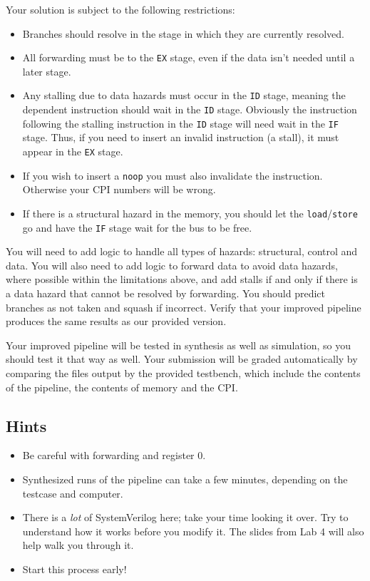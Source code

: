 \documentclass{article}
\begin{document}
Your solution is subject to the following restrictions:
\begin{itemize}
	\item Branches should resolve in the stage in which they are currently
		resolved.
	\item All forwarding must be to the \texttt{EX} stage, even if the data
		isn't needed until a later stage.
	\item Any stalling due to data hazards must occur in the \texttt{ID} stage,
		meaning the dependent instruction should wait in the \texttt{ID} stage.
		Obviously the instruction following the stalling instruction in the
		\texttt{ID} stage will need wait in the \texttt{IF} stage. Thus, if you
		need to insert an invalid instruction (a stall), it must appear in the
		\texttt{EX} stage. 
	\item If you wish to insert a \texttt{noop} you must also invalidate the
		instruction. Otherwise your CPI numbers will be wrong.
	\item If there is a structural hazard in the memory, you should let the
		\texttt{load}/\texttt{store} go and have the \texttt{IF} stage wait for
		the bus to be free.
\end{itemize}

You will need to add logic to handle all types of hazards: structural, control 
and data. You will also need to add logic to forward data to avoid data hazards,
where possible within the limitations above, and add stalls if and only if there
is a data hazard that cannot be resolved by forwarding. You should predict
branches as not taken and squash if incorrect. Verify that your improved
pipeline produces the same results as our provided version.

Your improved pipeline will be tested in synthesis as well as simulation, so you
should test it that way as well. Your submission will be graded automatically by
comparing the files output by the provided testbench, which include the
contents of the pipeline, the contents of memory and the CPI.

\subsection{Hints}
\begin{itemize}
	\item Be careful with forwarding and register 0.
	\item Synthesized runs of the pipeline can take a few minutes, depending on
		the testcase and computer.
	\item There is a \emph{lot} of SystemVerilog here; take your time looking it
		over. Try to understand how it works before you modify it. The slides
		from Lab 4 will also help walk you through it.
	\item Start this process early!
\end{itemize}
\end{document}
